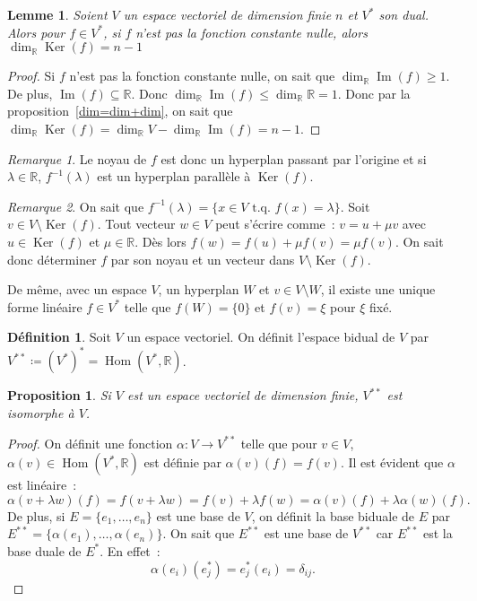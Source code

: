 \documentclass{article}
\DeclareMathOperator{\Ker}{Ker}
\DeclareMathOperator{\Imf}{Im}
\DeclareMathOperator{\Hom}{Hom}
\newcommand{\R}{\mathbb R}
\newcommand{\tq}{\textrm{ t.q. }}
\newtheorem{prp}[thm]{Proposition}
\newtheorem{lem}[thm]{Lemme}
\theoremstyle{definition}
\newtheorem{déf}[thm]{Définition}
\theoremstyle{remark}
\newtheorem*{rmq}{Remarque}
\begin{document}
		\begin{lem} Soient $V$ un espace vectoriel de dimension finie $n$ et $V^*$ son dual. Alors pour $f \in V^*$, si $f$ n'est pas la fonction constante nulle,
		alors $\dim_\R \Ker(f) = n-1$ \end{lem}

		\begin{proof} Si $f$ n'est pas la fonction constante nulle, on sait que $\dim_\R \Imf(f) \geq 1$. De plus, $\Imf(f) \subseteq \R$. Donc
		$\dim_\R\Imf(f) \leq \dim_\R \R = 1$. Donc par la proposition~\ref{dim=dim+dim}, on sait que $\dim_\R\Ker(f) = \dim_\R V - \dim_\R\Imf(f) = n-1$. \end{proof}

		\begin{rmq} Le noyau de $f$ est donc un hyperplan passant par l'origine et si $\lambda \in \R$, $f^{-1}(\lambda)$ est un hyperplan parallèle à $\Ker(f)$. \end{rmq}

		\begin{rmq} On sait que $f^{-1}(\lambda) = \{x \in V \tq f(x) = \lambda\}$. Soit $v \in V \setminus \Ker(f)$. Tout vecteur $w \in V$ peut s'écrire comme~:
		$v = u + \mu v$ avec $u \in \Ker(f)$ et $\mu \in \R$. Dès lors $f(w) = f(u) + \mu f(v) = \mu f(v)$. On sait donc déterminer $f$ par son noyau et un vecteur dans
		$V \setminus \Ker(f)$. 

		De même, avec un espace $V$, un hyperplan $W$ et $v \in V \setminus W$, il existe une unique forme linéaire $f \in V^*$ telle que $f(W) = \{0\}$ et $f(v) = \xi$
		pour $\xi$ fixé. \end{rmq}

		\begin{déf} Soit $V$ un espace vectoriel. On définit l'espace bidual de $V$ par $V^{**} \coloneqq (V^*)^* = \Hom(V^*, \R)$. \end{déf}

		\begin{prp} Si $V$ est un espace vectoriel de dimension finie, $V^{**}$ est isomorphe à $V$. \end{prp}

		\begin{proof} On définit une fonction $\alpha : V \to V^{**}$ telle que pour $v \in V$, $\alpha(v) \in \Hom(V^*, \R)$ est définie par $\alpha(v)(f) = f(v)$.
		Il est évident que $\alpha$ est linéaire~: \[\alpha(v+\lambda w)(f) = f(v+\lambda w) = f(v)+\lambda f(w) = \alpha(v)(f) + \lambda\alpha(w)(f).\]
		De plus, si $E = \{e_1, \dotsc, e_n\}$ est une base de $V$, on définit la base biduale de $E$ par $E^{**} = \{\alpha(e_1), \dotsc, \alpha(e_n)\}$.
		On sait que $E^{**}$ est une base de $V^{**}$ car $E^{**}$ est la base duale de $E^*$. En effet~: \[\alpha(e_i)(e_j^*) = e_j^*(e_i) = \delta_{ij}.\] \end{proof}
\end{document}
